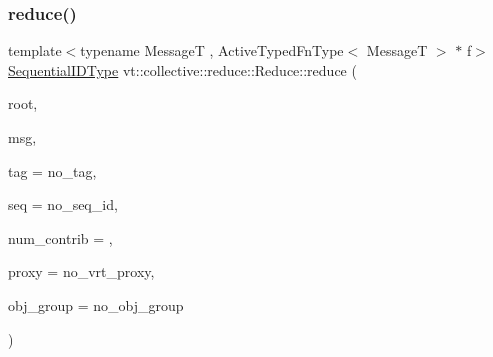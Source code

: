 \subsubsection{\texorpdfstring{reduce()}{reduce()}\hspace{0.1cm}{\footnotesize\ttfamily [1/3]}}
{\footnotesize\ttfamily template$<$typename MessageT , Active\+Typed\+Fn\+Type$<$ Message\+T $>$ $\ast$ f$>$ \\
\hyperlink{namespacevt_a3063d4db3b879d6dd2c7b8d50995c7f6}{Sequential\+I\+D\+Type} vt\+::collective\+::reduce\+::\+Reduce\+::reduce (\begin{DoxyParamCaption}\item[{\hyperlink{namespacevt_a866da9d0efc19c0a1ce79e9e492f47e2}{Node\+Type}}]{root,  }\item[{MessageT $\ast$const}]{msg,  }\item[{\hyperlink{namespacevt_a84ab281dae04a52a4b243d6bf62d0e52}{Tag\+Type}}]{tag = {\ttfamily no\+\_\+tag},  }\item[{\hyperlink{namespacevt_a3063d4db3b879d6dd2c7b8d50995c7f6}{Sequential\+I\+D\+Type}}]{seq = {\ttfamily no\+\_\+seq\+\_\+id},  }\item[{\hyperlink{structvt_1_1collective_1_1reduce_1_1_reduce_a6fd4d5e956ac5acd321e57c7dad5131f}{Reduce\+Num\+Type}}]{num\+\_\+contrib = {},  }\item[{\hyperlink{namespacevt_a1b417dd5d684f045bb58a0ede70045ac}{Virtual\+Proxy\+Type}}]{proxy = {\ttfamily no\+\_\+vrt\+\_\+proxy},  }\item[{\hyperlink{namespacevt_ad7cae989df485fccca57f0792a880a8e}{Obj\+Group\+Proxy\+Type}}]{obj\+\_\+group = {\ttfamily no\+\_\+obj\+\_\+group} }\end{DoxyParamCaption})}

\mbox{\label{structvt_1_1collective_1_1reduce_1_1_reduce_a484cfaf8063afa89db2116c1781f9384}} 
